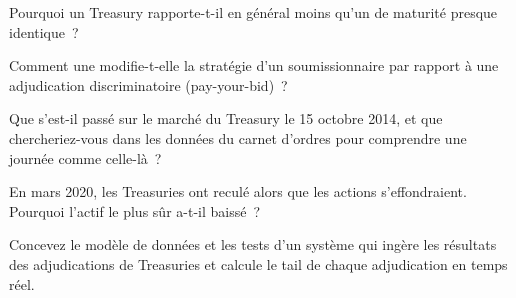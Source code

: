 \begin{interviewq}\label{iq:m2:the-treasury-market:2}
Pourquoi un Treasury  rapporte-t-il en général moins qu'un  de
maturité presque identique~?
\end{interviewq}

\begin{interviewq}\label{iq:m2:the-treasury-market:3}
Comment une  modifie-t-elle la stratégie d'un soumissionnaire par
rapport à une adjudication discriminatoire (pay-your-bid)~?
\end{interviewq}

\begin{interviewq}\label{iq:m2:the-treasury-market:4}
Que s'est-il passé sur le marché du Treasury le 15 octobre 2014, et que
chercheriez-vous dans les données du carnet d'ordres pour comprendre une journée comme celle-là~?
\end{interviewq}

\begin{interviewq}\label{iq:m2:the-treasury-market:5}
En mars 2020, les Treasuries ont reculé alors que les actions
s'effondraient. Pourquoi l'actif le plus sûr a-t-il baissé~?
\end{interviewq}

\begin{interviewq}\label{iq:m2:the-treasury-market:6}
Concevez le modèle de données et les tests d'un système qui ingère les résultats des
adjudications de Treasuries et calcule le tail de chaque adjudication en temps réel.
\end{interviewq}
